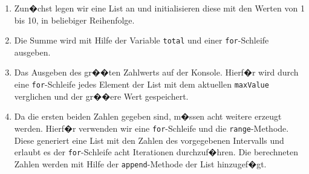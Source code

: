 \begin{enumerate}
	\item Zun�chst legen wir eine List an und initialisieren diese mit den Werten von 1 bis 10, in beliebiger Reihenfolge.
	
	
	\item Die Summe wird mit Hilfe der Variable \lstinline$total$ und einer \lstinline$for$-Schleife ausgeben.
	
	
	\item Das Ausgeben des gr��ten Zahlwerts auf der Konsole. Hierf�r wird durch eine \lstinline$for$-Schleife jedes Element der List mit dem aktuellen \lstinline$maxValue$ verglichen und der gr��ere Wert gespeichert. 
	 
	
	\item Da die ersten beiden Zahlen gegeben sind, m�ssen acht weitere erzeugt werden. Hierf�r verwenden wir eine \lstinline$for$-Schleife und die \lstinline$range$-Methode. Diese generiert eine List mit den Zahlen des vorgegebenen Intervalls und erlaubt es der \lstinline$for$-Schleife acht Iterationen durchzuf�hren. Die berechneten Zahlen werden mit Hilfe der \lstinline$append$-Methode der List hinzugef�gt. 
	
	
\end{enumerate}